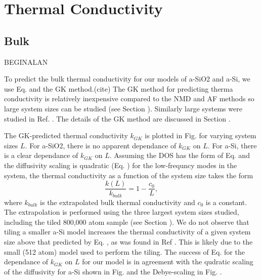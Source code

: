 \documentclass[aps,prb,twocolumn,superscriptaddress,footinbib,amsmath,amssymb,floatfix]{revtex4}
\begin{document}

\section{\label{S:Conductivity}Thermal Conductivity}

\subsection{\label{S:Bulk}Bulk}

BEGINALAN

To predict the bulk thermal conductivity for our models of a-SiO2 and 
a-Si, we use Eq. and the GK method.(cite) The GK method for predicting 
therma conductivity
is relatively inexpensive compared to the NMD and AF methods so  
large system sizes can be studied (see Section ).  Similarly large 
systems were studied in Ref. . The details of the 
GK method are discussed in Section . 

The GK-predicted thermal conductivity $k_{GK}$ is plotted in Fig. for 
varying system sizes $L$. For a-SiO2, there is no apparent dependance 
of $k_{GK}$ on $L$. For a-Si, there is a clear dependance of $k_{GK}$ on 
$L$. Assuming the DOS has the form of Eq. and the diffusivity scaling 
is quadratic (Eq. ) for the low-frequncy modes in the system, 
the thermal conductivity as a function of the system size 
takes the form
\begin{equation}\label{EQ:k0}
\frac{k(L)}{k_{bulk}} = 1 - \frac{c_0}{L},
\end{equation}
where $k_{bulk}$ is the extrapolated bulk thermal conductivity and $c_0$ 
is a constant. The extrapolation is performed using the three largest 
system sizes studied, including the tiled 800,000 atom sample (see 
Section ). We do not observe that tiling a smaller a-Si model increases 
the thermal 
conductivity of a given system size above that predicted by Eq. , as 
was found in Ref . This is likely due to the 
small (512 atom) model used to perform the tiling. The success of 
Eq. for the dependance of $k_{GK}$ on $L$ for our model is in 
agreement with the qudratic scaling of the 
diffusivity for a-Si shown in Fig. and the Debye-scaling in Fig. . 
\end{document}
